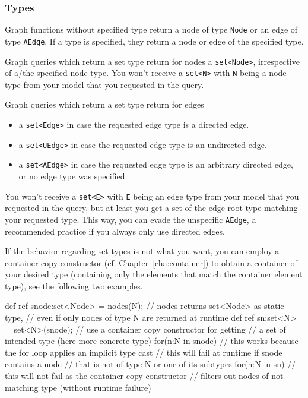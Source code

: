 \subsubsection*{Types}
Graph functions without specified type return a node of type \texttt{Node} or an edge of type \texttt{AEdge}. 
If a type is specified, they return a node or edge of the specified type.

Graph queries which return a set type return for nodes a \texttt{set<Node>}, irrespective of a/the specified node type. 
You won't receive a \texttt{set<N>} with \texttt{N} being a node type from your model that you requested in the query.

Graph queries which return a set type return for edges
\begin{itemize}
	\item a \texttt{set<Edge>} in case the requested edge type is a directed edge.
	\item a \texttt{set<UEdge>} in case the requested edge type is an undirected edge.
	\item a \texttt{set<AEdge>} in case the requested edge type is an arbitrary directed edge, \\or no edge type was specified.
\end{itemize}
You won't receive a \texttt{set<E>} with \texttt{E} being an edge type from your model that you requested in the query, but at least you get a set of the edge root type matching your requested type. 
This way, you can evade the unspecific \texttt{AEdge}, a recommended practice if you always only use directed edges.

If the behavior regarding set types is not what you want, you can employ a container copy constructor (cf. Chapter~\ref{cha:container}) to obtain a container of your desired type (containing only the elements that match the container element type), see the following two examples.

\begin{example}
\begin{grgen}
def ref snode:set<Node> = nodes(N); // nodes returns set<Node> as static type,
                                    // even if only nodes of type N are returned at runtime
def ref sn:set<N> = set<N>(snode); // use a container copy constructor for getting
                                   // a set of intended type (here more concrete type)
for(n:N in snode) { // this works because the for loop applies an implicit type cast
                    // this will fail at runtime if snode contains a node
                    // that is not of type N or one of its subtypes
}
for(n:N in sn) { // this will not fail as the container copy constructor 
                 // filters out nodes of not matching type (without runtime failure)
}
\end{grgen}
\end{example}

